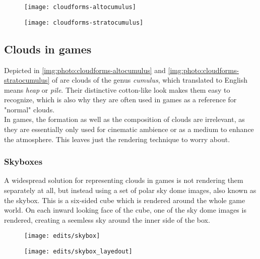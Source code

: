 \begin{figure}[ht]
    \centering
        \begin{minipage}{0.47\linewidth}
            \texttt{[image: cloudforms-altocumulus]}
            \label{img:photo:cloudforms-altocumulus}        
        \end{minipage}        
    \hfill
        \begin{minipage}{0.47\linewidth}
            \texttt{[image: cloudforms-stratocumulus]}
            \label{img:photo:cloudforms-stratocumulus}        
        \end{minipage}  
\end{figure}



\subsection{Clouds in games}
Depicted in \autoref{img:photo:cloudforms-altocumulus} and \autoref{img:photo:cloudforms-stratocumulus} of  are clouds of the genus \textit{cumulus}, which translated to English means \textit{heap} or \textit{pile}.
Their distinctive cotton-like look makes them easy to recognize, which is also why they are often used in games as a reference for "normal" clouds. 
\\
In games, the formation as well as the composition of clouds are irrelevant, as they are essentially only used for cinematic ambience or as a medium to enhance the atmosphere. This leaves just the rendering technique to worry about.

\subsubsection{Skyboxes}
A widespread solution for representing clouds in games is not rendering them separately at all, but instead using a set of polar sky dome images, also known as the skybox. This is a six-sided cube which is rendered around the whole game world. On each inward looking face of the cube, one of the sky dome images is rendered, creating a seemless sky around the inner side of the box.
\begin{figure}[H]
    \centering
        \begin{minipage}{0.47\linewidth}
            \texttt{[image: edits/skybox]}
            \label{img:edits:skybox}
        \end{minipage}
    \hfill
        \begin{minipage}{0.45\linewidth}
            \texttt{[image: edits/skybox\_layedout]}
            \label{img:edits:skybox_layedout}
        \end{minipage}
\end{figure}


